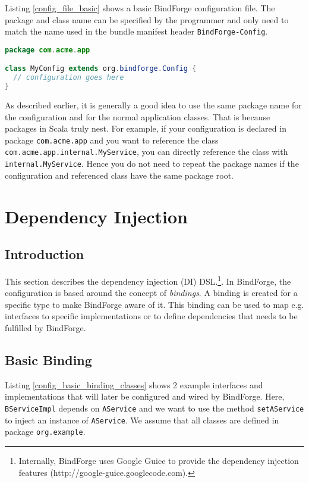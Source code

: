 Listing \ref{config_file_basic} shows a basic BindForge configuration file. The package and class name can be specified by the programmer and only need to match the name used in the bundle manifest header \verb!BindForge-Config!.

\begin{lstlisting}[caption={BindForge configuration file},label=config_file_basic,language=Java]
package com.acme.app

class MyConfig extends org.bindforge.Config {
  // configuration goes here
}
\end{lstlisting}

As described earlier, it is generally a good idea to use the same package name for the configuration and for the normal application classes. That is because packages in Scala truly nest. For example, if your configuration is declared in package \verb!com.acme.app! and you want to reference the class \verb!com.acme.app.internal.MyService!, you can directly reference the class with \verb!internal.MyService!. Hence you do not need to repeat the package names if the configuration and referenced class have the same package root.


\section{Dependency Injection}

\subsection{Introduction}

This section describes the dependency injection (DI) DSL.\footnote{Internally, BindForge uses Google Guice to provide the dependency injection features (http://google-guice.googlecode.com).}. In BindForge, the configuration is based around the concept of \textit{bindings}. A binding is created for a specific type to make BindForge aware of it. This binding can be used to map e.g. interfaces to specific implementations or to define dependencies that needs to be fulfilled by BindForge.

\subsection{Basic Binding}

Listing \ref{config_basic_binding_classes} shows 2 example interfaces and implementations that will later be configured and wired by BindForge. Here, \verb!BServiceImpl! depends on \verb!AService! and we want to use the method \verb!setAService! to inject an instance of \verb!AService!. We assume that all classes are defined in package \verb!org.example!.

